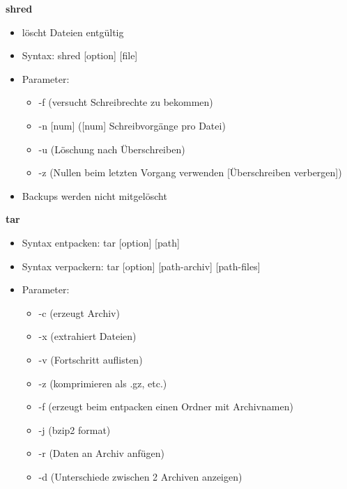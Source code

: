 \documentclass[12pt,utf8, 10pt]{article}
\begin{document}
\textbf{shred}
\begin{itemize}
	\item löscht Dateien entgültig
	\item Syntax: shred [option] [file]
	\item Parameter:
	\begin{itemize}
		\item -f (versucht Schreibrechte zu bekommen)
		\item -n [num] ([num] Schreibvorgänge pro Datei)
		\item -u (Löschung nach Überschreiben)
		\item -z (Nullen beim letzten Vorgang verwenden [Überschreiben verbergen])
	\end{itemize}
	\item Backups werden nicht mitgelöscht
\end{itemize}

\textbf{tar}
\begin{itemize}
	\item Syntax entpacken: tar [option] [path]
	\item Syntax verpackern: tar [option] [path-archiv] [path-files]
	\item Parameter:
	\begin{itemize}
		\item -c (erzeugt Archiv)
		\item -x (extrahiert Dateien)
		\item -v (Fortschritt auflisten)
		\item -z (komprimieren als .gz, etc.)
		\item -f (erzeugt beim entpacken einen Ordner mit Archivnamen)
		\item -j (bzip2 format)
		\item -r (Daten an Archiv anfügen)
		\item -d (Unterschiede zwischen 2 Archiven anzeigen)
	\end{itemize}
\end{itemize}
\end{document}
